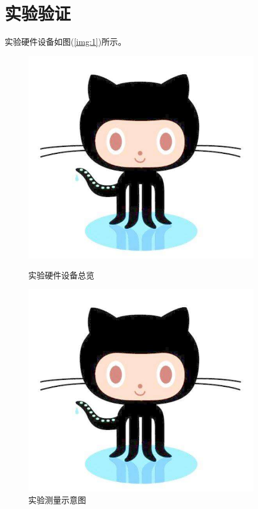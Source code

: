 \documentclass[winfonts,bachelor,oneside,nobackinfo]{njuthesis}
\begin{document}
\chapter{实验验证}
\lipsum[2]

实验硬件设备如图(\ref{img:1})所示。
\begin{figure}[htbp]
\begin{minipage}[t]{0.5\textwidth}
\centering
\includegraphics[width=0.9\textwidth]{./pictures/github.jpg}
\caption{实验硬件设备总览}
\label{img:1}
\end{minipage}
\begin{minipage}[t]{0.5\textwidth}
\centering
\includegraphics[width=0.9\textwidth]{./pictures/github.jpg}
\caption{实验测量示意图}
\label{img:2}
\end{minipage}
\end{figure}
\end{document}

